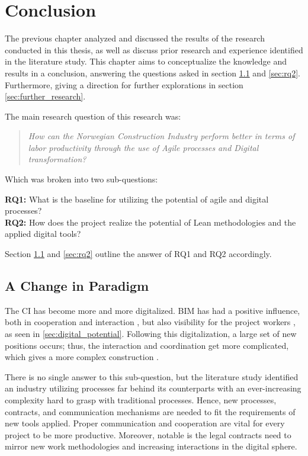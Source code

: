 
\chapter{Conclusion} \label{cha:conclusion}
The previous chapter analyzed and discussed the results of the research conducted in this thesis, as well as discuss prior research and experience identified in the literature study. This chapter aims to conceptualize the knowledge and results in a conclusion, answering the questions asked in section \ref{sec:rq1} and \ref{sec:rq2}. Furthermore, giving a direction for further explorations in section \ref{sec:further_research}.

\noindent The main research question of this research was: 
\begin{quote}
    \textit{How can the Norwegian Construction Industry perform better in terms of labor productivity through the use of Agile processes and Digital transformation?} 
\end{quote}

\noindent Which was broken into two sub-questions:

{\noindent \bf RQ1:} What is the baseline for utilizing the potential of agile and digital processes? \\
{\bf RQ2:} How does the project realize the potential of Lean methodologies and the applied digital tools?

Section \ref{sec:rq1} and \ref{sec:rq2} outline the answer of RQ1 and RQ2 accordingly.

\section{A Change in Paradigm} \label{sec:rq1}
The CI has become more and more digitalized. BIM has had a positive influence, both in cooperation and interaction \cite{frank_gehry, gu2010understanding}, but also visibility for the project workers \cite{arayici2010building}, as seen in \ref{sec:digital_potential}. Following this digitalization, a large set of new positions occurs; thus, the interaction and coordination get more complicated, which gives a more complex construction \cite{arayici2010building, eadie2013bim, arayici2011technology}.

There is no single answer to this sub-question, but the literature study identified an industry utilizing processes far behind its counterparts with an ever-increasing complexity hard to grasp with traditional processes. Hence, new processes, contracts, and communication mechanisms are needed to fit the requirements of new tools applied. Proper communication and cooperation are vital for every project to be more productive. Moreover, notable is the legal contracts need to mirror new work methodologies and increasing interactions in the digital sphere.

